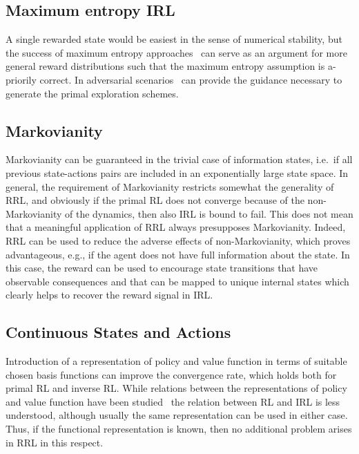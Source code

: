 \documentclass{article}
\begin{document}
\subsection{Maximum entropy IRL}

A single rewarded state would be easiest in the sense of numerical stability, but the success of
maximum entropy approaches~\cite{ziebart2008maximum} can serve as an argument for more general 
reward distributions such that the maximum entropy assumption is a-priorily correct.
In adversarial scenarios~\cite{finn2016connection} can provide the guidance 
necessary to generate the primal exploration schemes.

\subsection{Markovianity}

Markovianity can be guaranteed in the trivial case of information states, i.e.~if all previous state-actions pairs are  included in an exponentially large state space. In general, the requirement of Markovianity restricts somewhat the generality of RRL, and obviously
if the primal RL does not converge because of the non-Markovianity of the dynamics, then also IRL is bound to fail. This does not mean that a meaningful application of RRL always presupposes Markovianity.
 Indeed, RRL can be used to reduce the adverse effects of non-Markovianity, which proves advantageous, e.g., if the agent does not have full information about the state. 
In this case, the reward can be used to encourage state transitions that have observable consequences and that can be mapped to unique internal states which clearly helps to recover the reward signal in IRL.  


\subsection{Continuous States and Actions}

Introduction of a representation of policy and value function in terms of suitable chosen 
basis functions can improve the convergence rate, which holds both for primal RL and inverse RL.
While relations between the representations of policy and value function have been 
studied~\cite{kakade2002natural,sutton2000policy} the relation between RL and IRL is less 
understood, although usually the same representation can be used in either case. Thus, 
if the functional representation is known, then no additional problem arises in RRL in this 
respect.
\end{document}
